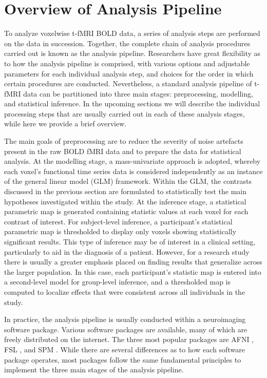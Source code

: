 \section{Overview of Analysis Pipeline}

To analyze voxelwise t-fMRI BOLD data, a series of analysis steps are performed on the data in succession. Together, the complete chain of analysis procedures carried out is known as the analysis pipeline. Researchers have great flexibility as to how the analysis pipeline is comprised, with various options and adjustable parameters for each individual analysis step, and choices for the order in which certain procedures are conducted. Nevertheless, a standard analysis pipeline of t-fMRI data can be partitioned into three main stages: preprocessing, modelling, and statistical inference. In the upcoming sections we will describe the individual processing steps that are usually carried out in each of these analysis stages, while here we provide a brief overview.

The main goals of preprocessing are to reduce the severity of noise artefacts present in the raw BOLD fMRI data and to prepare the data for statistical analysis. At the modelling stage, a mass-univariate approach is adopted, whereby each voxel's functional time series data is considered independently as an instance of the general linear model (GLM) framework. Within the GLM, the contrasts discussed in the previous section are formulated to statistically test the main hypotheses investigated within the study. At the inference stage, a statistical parametric map is generated containing statistic values at each voxel for each contrast of interest. For subject-level inference, a participant's statistical parametric map is thresholded to display only voxels showing statistically significant results. This type of inference may be of interest in a clinical setting, particularly to aid in the diagnosis of a patient. However, for a research study there is usually a greater emphasis placed on finding results that generalize across the larger population. In this case, each participant's statistic map is entered into a second-level model for group-level inference, and a thresholded map is computed to localize effects that were consistent across all individuals in the study. 


In practice, the analysis pipeline is usually conducted within a neuroimaging software package. Various software packages are available, many of which are freely distributed on the internet. The three most popular packages are AFNI \citep{Cox1996-nu}, FSL \citep{Jenkinson2012-wh}, and SPM \citep{Penny2011-uk}. While there are several differences as to how each software package operates, most packages follow the same fundamental principles to implement the three main stages of the analysis pipeline.     


